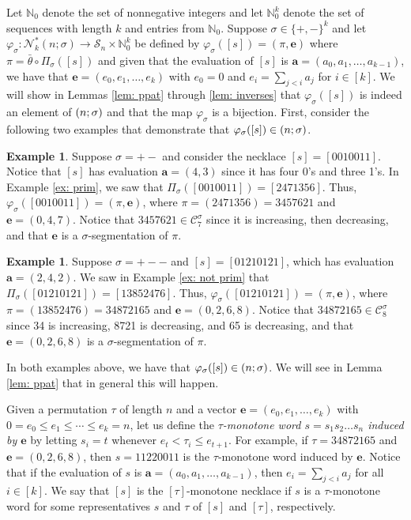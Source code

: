 \documentclass[12pt]{article}
\newcommand{\todo}[1]{\vspace{2 mm}\par\noindent
   \marginpar[\flushright\textsc{ToDo}]{\textsc{ToDo}}\framebox{\begin{minipage}[c]{\textwidth}
   \tt #1 \end{minipage}}\vspace{2 mm}\par}
\let\SS\relax
\DeclareMathOperator{\SS}{Seg}
\renewcommand{\S}{\mathcal{S}}
\newcommand{\C}{\mathcal{C}}
\newcommand{\N}{\mathcal{N}}
\newcommand{\e}{\mathbf{e}}
\theoremstyle{plain}
\theoremstyle{definition}
\newtheorem{example}[theorem]{Example}
\begin{document}



Let $\mathbb{N}_0$ denote the set of nonnegative integers and let $\mathbb{N}_0^k$ denote the set of sequences with length $k$ and entries from $\mathbb{N}_0$. Suppose $\sigma\in\{+,-\}^k$ and let $\varphi_\sigma:\N^*_k(n;\sigma) \to \S_n\times \mathbb{N}_0^k$ be defined by $\varphi_\sigma([s]) = (\pi,\e)$ where $\pi= \bar\theta \circ \Pi_\sigma([s])$ and given that the evaluation of $[s]$ is $\textbf{a}=(a_0, a_1,\ldots, a_{k-1})$, we have that $\e=(e_0, e_1, \ldots, e_k)$ with $e_0=0$ and $e_i = \sum_{j<i} a_j$ for $i\in[k]$. We will show in Lemmas \ref{lem: ppat} through \ref{lem: inverses} that $\varphi_\sigma([s])$ is indeed an element of $\SS(n;\sigma)$ and that the map $\varphi_\sigma$ is a bijection. First, consider the following two examples that demonstrate that $\varphi_\sigma([s]) \in \SS(n;\sigma)$.

\begin{example}
Suppose $\sigma=+-$ and consider the necklace $[s]=[0010011]$. Notice that $[s]$ has evaluation $\mathbf{a}=(4,3)$ since it has four 0's and three 1's. In Example \ref{ex: prim}, we saw that $\Pi_\sigma([0010011]) = [2471356].$ Thus, $\varphi_\sigma([0010011]) = (\pi, \e)$, where $\pi = (2471356) = 3457621$ and $\e=(0,4,7)$. Notice that $3457621 \in \C^\sigma_7$ since it is increasing, then decreasing, and that $\e$ is a $\sigma$-segmentation of $\pi$. 
\end{example}
\begin{example}
Suppose $\sigma = +--$ and $[s]=[01210121]$, which has evaluation $\mathbf{a}=(2,4,2)$. We saw in Example \ref{ex: not prim} that $\Pi_\sigma([01210121]) = [13852476]$.  Thus, $\varphi_\sigma([01210121]) = (\pi, \e)$, where $\pi = (13852476) =34872165$ and $\e=(0,2, 6,8)$. Notice that $34872165 \in \C^\sigma_8$ since 34 is increasing, 8721 is decreasing, and 65 is decreasing, and that $\e=(0,2,6,8)$ is a $\sigma$-segmentation of $\pi$.
\end{example}
In both examples above, we have that $\varphi_\sigma([s]) \in \SS(n;\sigma)$. We will see in Lemma \ref{lem: ppat} that in general this will happen. 

Given a permutation $\tau$ of length $n$ and a vector $\e=(e_0,e_1,\ldots,e_k)$ with $0=e_0\leq e_1\leq \cdots \leq e_k=n$, let us define the \textit{$\tau$-monotone word $s=s_1s_2\ldots s_n$ induced by $\e$} by letting $s_i = t$ whenever $e_{t}< \tau_i\leq e_{t+1}$. For example, if $\tau=34872165$ and $\e=(0,2,6,8)$, then $s=11220011$ is the $\tau$-monotone word induced by $\e$.  Notice that if the evaluation of $s$ is $\mathbf{a}=(a_0, a_1, \ldots, a_{k-1})$, then $e_i=\sum_{j<i} a_j$ for all $i\in[k]$. We say that $[s]$ is the $[\tau]$-monotone necklace if $s$ is a $\tau$-monotone word for some representatives $s$ and $\tau$ of $[s]$ and $[\tau]$, respectively. 
\end{document}
